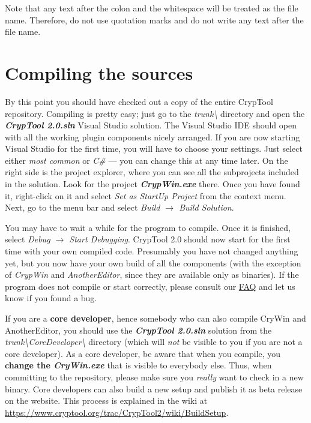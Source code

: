 \begin{center}
\end{center}

Note that any text after the colon and the whitespace will be treated as the file name. Therefore, do not use quotation marks and do not write any text after the file name.

\section{Compiling the sources}
\label{CompilingTheSources}

By this point you should have checked out a copy of the entire CrypTool repository. Compiling is pretty easy; just go to the \textit{trunk\textbackslash } directory and open the \textbf{\textit{CrypTool 2.0.sln}} Visual Studio solution. The Visual Studio IDE should open with all the working plugin components nicely arranged. If you are now starting Visual Studio for the first time, you will have to choose your settings. Just select either \textit{most common} or \textit{C\#} --- you can change this at any time later. On the right side is the project explorer, where you can see all the subprojects included in the solution. Look for the project \textbf{\textit{CrypWin.exe}} there. Once you have found it, right-click on it and select \textit{Set as StartUp Project} from the context menu. Next, go to the menu bar and select \textit{Build $\rightarrow$ Build Solution}.

You may have to wait a while for the program to compile. Once it is finished, select \textit{Debug $\rightarrow$ Start Debugging}. CrypTool 2.0 should now start for the first time with your own compiled code. Presumably you have not changed anything yet, but you now have your own build of all the components (with the exception of \textit{CrypWin} and \textit{AnotherEditor}, since they are available only as binaries). If the program does not compile or start correctly, please consult our \href{https://www.cryptool.org/trac/CrypTool2/wiki/FAQ}{FAQ} and let us know if you found a bug.

If you are a \textbf{core developer}, hence somebody who can also compile CryWin and AnotherEditor, you should use the \textbf{\textit{CrypTool 2.0.sln}} solution from the \textit{trunk\textbackslash CoreDeveloper\textbackslash } directory (which will \textit{not} be visible to you if you are not a core developer). As a core developer, be aware that when you compile, you \textbf{change the \textit{CryWin.exe}} that is visible to everybody else. Thus, when committing to the repository, please make sure you \textit{really} want to check in a new binary. Core developers can also build a new setup and publish it as beta release on the website. This process is explained in the wiki at \url{https://www.cryptool.org/trac/CrypTool2/wiki/BuildSetup}.